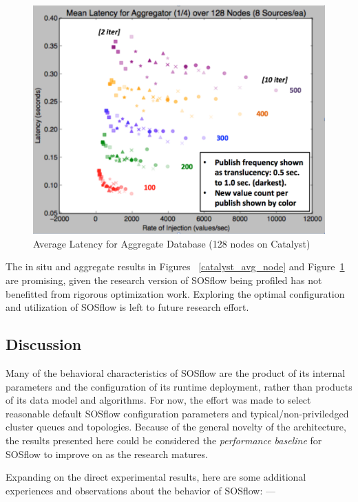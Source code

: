 \begin{figure}[h]
\centering
\includegraphics[width=\columnwidth]{images/avg_128.png}
\caption{Average Latency for Aggregate Database (128 nodes on Catalyst)}
\label{catalyst_avg_128}
\end{figure}

%
The in situ and aggregate results in Figures ~\ref{catalyst_avg_node}
and Figure~\ref{catalyst_avg_128} are promising, given the research
version of SOSflow being profiled has not benefitted from rigorous
optimization work.
%
Exploring the optimal configuration and utilization of SOSflow is left
to future research effort.
%
\subsection{Discussion}
%
Many of the behavioral characteristics of SOSflow are the product of
its internal parameters and the configuration of its runtime
deployment, rather than products of its data model and algorithms.
%
For now, the effort was made to select reasonable default SOSflow
configuration parameters and typical/non-priviledged cluster queues
and topologies.
%
Because of the general novelty of the architecture, the results
presented here could be considered the \textit{performance baseline}
for SOSflow to improve on as the research matures.
%
\par
%
Expanding on the direct experimental results, here are some additional
experiences and observations about the behavior of SOSflow: ---
%
